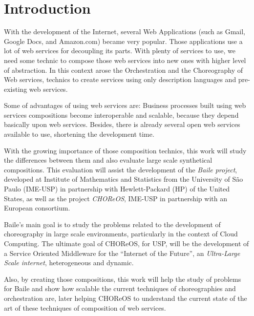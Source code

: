 \section{Introduction}

With the development of the Internet, several Web Applications (such as Gmail, Google Docs, and Amazon.com) became very popular. Those applications use a lot of web services for decoupling its parts. With plenty of services to use, we need some technic to compose those web services into new ones with higher level of abstraction. In this context arose the Orchestration and the Choreography of Web services, technics to create services using only description languages and pre-existing web services.

Some of advantages of using web services are:
Business processes built using web services compositions become interoperable and scalable, because they depend basically upon web services. Besides, there is already several open web services available to use, shortening the development time.

With the growing importance of those composition technics, this work will study the differences between them and also evaluate large scale synthetical compositions. This evaluation will assist the development of the \emph{Baile project}, developed at Institute of Mathematics and Statistics from the University of São Paulo (IME-USP) in partnership with Hewlett-Packard (HP) of the United States, as well as the project \emph{CHOReOS}, IME-USP in partnership with an European consortium.

Baile’s main goal is to study the problems related to the development of choreography in large scale environments, particularly in the context of Cloud Computing. The ultimate goal of CHOReOS, for USP, will be the development of a Service Oriented Middleware for the ``Internet of the Future'', an \emph{Ultra-Large Scale internet}, heterogeneous and dynamic.

Also, by creating those compositions, this work will help the study of problems for Baile and show how scalable the current techniques of choreographies and orchestration are, later helping CHOReOS to understand the current state of the art of these techniques of composition of web services.